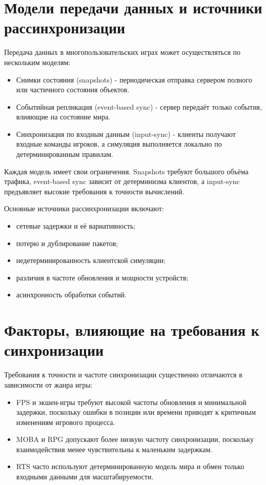 \section{Модели передачи данных и источники рассинхронизации}

Передача данных в многопользовательских играх может осуществляться по нескольким моделям:

\begin{itemize}
    \item Снимки состояния (snapshots) - периодическая отправка сервером полного или частичного состояния объектов.
    \item Событийная репликация (event-based sync) - сервер передаёт только события, влияющие на состояние мира.
    \item Синхронизация по входным данным (input-sync) - клиенты получают входные команды игроков, а симуляция выполняется локально по детерминированным правилам.
\end{itemize}

Каждая модель имеет свои ограничения. Snapshots требуют большого объёма трафика, event-based sync зависит от детерминизма клиентов, а input-sync предъявляет высокие требования к точности вычислений.

Основные источники рассинхронизации включают:

\begin{itemize}
    \item сетевые задержки и её вариативность;
    \item потерю и дублирование пакетов;
    \item недетерминированность клиентской симуляции;
    \item различия в частоте обновления и мощности устройств;
    \item асинхронность обработки событий.
\end{itemize}

\section{Факторы, влияющие на требования к синхронизации}

Требования к точности и частоте синхронизации существенно отличаются в зависимости от жанра игры:

\begin{itemize}
    \item FPS и экшен-игры требуют высокой частоты обновления и минимальной задержки, поскольку ошибки в позиции или времени приводят к критичным изменениям игрового процесса.
    \item MOBA и RPG допускают более низкую частоту синхронизации, поскольку взаимодействия менее чувствительны к маленьким задержкам.
    \item RTS часто используют детерминированную модель мира и обмен только входными данными для масштабируемости.
\end{itemize}

